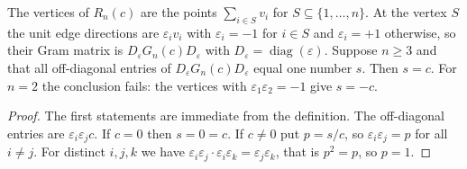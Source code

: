 \begin{lemma}\label{lem:vertex}
The vertices of $R_n(c)$ are the points $\sum_{i\in S}v_i$ for $S\subseteq\{1,\dots,n\}$. At the vertex $S$ the unit edge directions are $\varepsilon_iv_i$ with $\varepsilon_i=-1$ for $i\in S$ and $\varepsilon_i=+1$ otherwise, so their Gram matrix is $D_\varepsilon G_n(c)D_\varepsilon$ with $D_\varepsilon=\operatorname{diag}(\varepsilon)$.
Suppose $n\ge3$ and that all off-diagonal entries of $D_\varepsilon G_n(c)D_\varepsilon$ equal one number $s$. Then $s=c$.
For $n=2$ the conclusion fails: the vertices with $\varepsilon_1\varepsilon_2=-1$ give $s=-c$.
\end{lemma}
\begin{proof}
The first statements are immediate from the definition. The off-diagonal entries are $\varepsilon_i\varepsilon_jc$. If $c=0$ then $s=0=c$. If $c\ne0$ put $p=s/c$, so $\varepsilon_i\varepsilon_j=p$ for all $i\ne j$. For distinct $i,j,k$ we have $\varepsilon_i\varepsilon_j\cdot\varepsilon_i\varepsilon_k=\varepsilon_j\varepsilon_k$, that is $p^2=p$, so $p=1$.
\end{proof}
